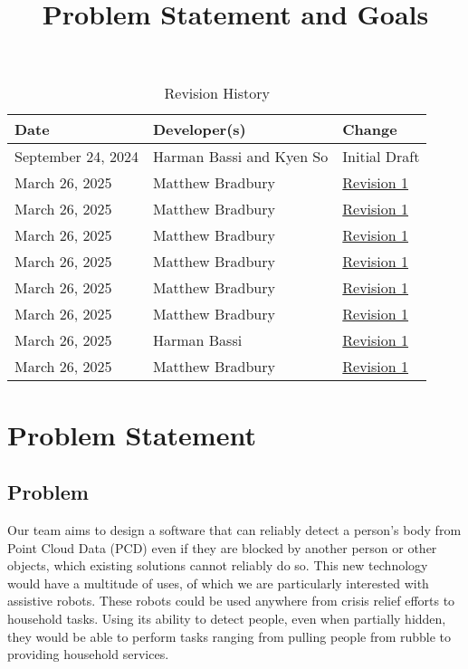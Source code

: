 \documentclass{article}
\title{Problem Statement and Goals\\\progname}
\author{\authname}
\date{}
\begin{document}
\maketitle

\begin{table}[hp]
\caption{Revision History} \label{TblRevisionHistory}
\begin{tabularx}{\textwidth}{llX}
\toprule
\textbf{Date} & \textbf{Developer(s)} & \textbf{Change}\\
\midrule
September 24, 2024 & Harman Bassi and Kyen So & Initial Draft\\
March 26, 2025 & Matthew Bradbury & \href{https://github.com/takhtart/PCD/issues/65}{Revision 1}\\
March 26, 2025 & Matthew Bradbury & \href{https://github.com/takhtart/PCD/issues/66}{Revision 1}\\
March 26, 2025 & Matthew Bradbury & \href{https://github.com/takhtart/PCD/issues/67}{Revision 1}\\
March 26, 2025 & Matthew Bradbury & \href{https://github.com/takhtart/PCD/issues/68}{Revision 1}\\
March 26, 2025 & Matthew Bradbury & \href{https://github.com/takhtart/PCD/issues/70}{Revision 1}\\
March 26, 2025 & Matthew Bradbury & \href{https://github.com/takhtart/PCD/issues/71}{Revision 1}\\
March 26, 2025 & Harman Bassi & \href{https://github.com/takhtart/PCD/issues/72}{Revision 1}\\
March 26, 2025 & Matthew Bradbury & \href{https://github.com/takhtart/PCD/issues/73}{Revision 1}\\
\bottomrule
\end{tabularx}
\end{table}

\newpage

\section{Problem Statement}

\subsection{Problem}
Our team aims to design a software that can reliably detect a person’s body from Point Cloud Data (PCD) even if they are blocked by another person or other objects, which existing solutions cannot reliably do so. This new technology would have a multitude of uses, of which we are particularly interested with assistive robots. These robots could be used anywhere from crisis relief efforts to household tasks. Using its ability to detect people, even when partially hidden, they would be able to perform tasks ranging from pulling people from rubble to providing household services. 
\end{document}
